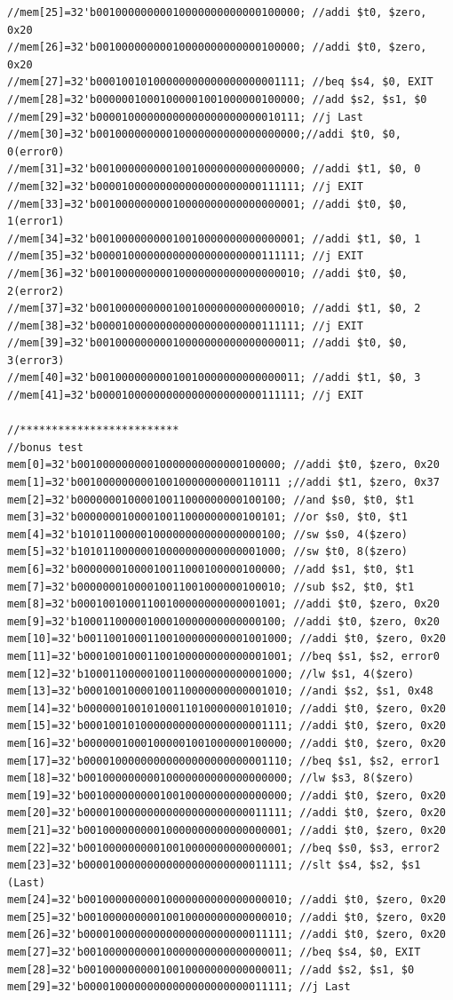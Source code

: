 \documentclass[a4paper,12pt]{article}
\begin{document}
\begin{lstlisting}
//mem[25]=32'b00100000000010000000000000100000; //addi $t0, $zero, 0x20
//mem[26]=32'b00100000000010000000000000100000; //addi $t0, $zero, 0x20
//mem[27]=32'b00010010100000000000000000001111; //beq $s4, $0, EXIT
//mem[28]=32'b00000010001000001001000000100000; //add $s2, $s1, $0
//mem[29]=32'b00001000000000000000000000010111; //j Last
//mem[30]=32'b00100000000010000000000000000000;//addi $t0, $0, 0(error0)
//mem[31]=32'b00100000000010010000000000000000; //addi $t1, $0, 0
//mem[32]=32'b00001000000000000000000000111111; //j EXIT
//mem[33]=32'b00100000000010000000000000000001; //addi $t0, $0, 1(error1)
//mem[34]=32'b00100000000010010000000000000001; //addi $t1, $0, 1
//mem[35]=32'b00001000000000000000000000111111; //j EXIT
//mem[36]=32'b00100000000010000000000000000010; //addi $t0, $0, 2(error2)
//mem[37]=32'b00100000000010010000000000000010; //addi $t1, $0, 2
//mem[38]=32'b00001000000000000000000000111111; //j EXIT
//mem[39]=32'b00100000000010000000000000000011; //addi $t0, $0, 3(error3)
//mem[40]=32'b00100000000010010000000000000011; //addi $t1, $0, 3
//mem[41]=32'b00001000000000000000000000111111; //j EXIT

//*************************
//bonus test
mem[0]=32'b00100000000010000000000000100000; //addi $t0, $zero, 0x20
mem[1]=32'b00100000000010010000000000110111 ;//addi $t1, $zero, 0x37
mem[2]=32'b00000001000010011000000000100100; //and $s0, $t0, $t1
mem[3]=32'b00000001000010011000000000100101; //or $s0, $t0, $t1
mem[4]=32'b10101100000100000000000000000100; //sw $s0, 4($zero)
mem[5]=32'b10101100000010000000000000001000; //sw $t0, 8($zero)
mem[6]=32'b00000001000010011000100000100000; //add $s1, $t0, $t1
mem[7]=32'b00000001000010011001000000100010; //sub $s2, $t0, $t1
mem[8]=32'b00010010001100100000000000001001; //addi $t0, $zero, 0x20
mem[9]=32'b10001100000100010000000000000100; //addi $t0, $zero, 0x20
mem[10]=32'b00110010001100100000000001001000; //addi $t0, $zero, 0x20
mem[11]=32'b00010010001100100000000000001001; //beq $s1, $s2, error0
mem[12]=32'b10001100000100110000000000001000; //lw $s1, 4($zero)
mem[13]=32'b00010010000100110000000000001010; //andi $s2, $s1, 0x48
mem[14]=32'b00000010010100011010000000101010; //addi $t0, $zero, 0x20
mem[15]=32'b00010010100000000000000000001111; //addi $t0, $zero, 0x20
mem[16]=32'b00000010001000001001000000100000; //addi $t0, $zero, 0x20
mem[17]=32'b00001000000000000000000000001110; //beq $s1, $s2, error1
mem[18]=32'b00100000000010000000000000000000; //lw $s3, 8($zero)
mem[19]=32'b00100000000010010000000000000000; //addi $t0, $zero, 0x20
mem[20]=32'b00001000000000000000000000011111; //addi $t0, $zero, 0x20
mem[21]=32'b00100000000010000000000000000001; //addi $t0, $zero, 0x20
mem[22]=32'b00100000000010010000000000000001; //beq $s0, $s3, error2
mem[23]=32'b00001000000000000000000000011111; //slt $s4, $s2, $s1 (Last)
mem[24]=32'b00100000000010000000000000000010; //addi $t0, $zero, 0x20
mem[25]=32'b00100000000010010000000000000010; //addi $t0, $zero, 0x20
mem[26]=32'b00001000000000000000000000011111; //addi $t0, $zero, 0x20
mem[27]=32'b00100000000010000000000000000011; //beq $s4, $0, EXIT
mem[28]=32'b00100000000010010000000000000011; //add $s2, $s1, $0
mem[29]=32'b00001000000000000000000000011111; //j Last



\end{lstlisting}
\end{document}
